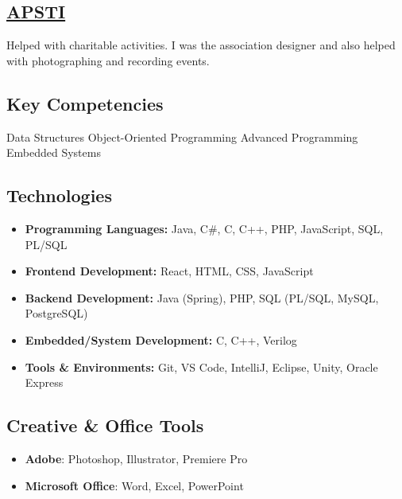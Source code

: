 \documentclass[a4paper]{MagicalCV}
\begin{document}
\begin{minipage}[t]{0.38\textwidth}
\subsection{\href{https://www.facebook.com/AsociatiaPSTI}{APSTI}}
Helped with charitable activities. I was the association designer and also helped with photographing and recording events.
\sectionsep

\end{minipage} 
\hfill
\begin{minipage}[t]{0.59\textwidth} 


\subsection{Key Competencies}
Data Structures \textbullet{} Object-Oriented Programming \textbullet{} Advanced Programming \textbullet{} Embedded Systems
\sectionsep

\subsection{Technologies}
\begin{itemize}
    \item \textbf{Programming Languages:} Java, C\#, C, C++, PHP, JavaScript, SQL, PL/SQL
    \item \textbf{Frontend Development:} React, HTML, CSS, JavaScript
    \item \textbf{Backend Development:} Java (Spring), PHP, SQL (PL/SQL, MySQL, PostgreSQL)
    \item \textbf{Embedded/System Development:} C, C++, Verilog
    \item \textbf{Tools \& Environments:} Git, VS Code, IntelliJ, Eclipse, Unity, Oracle Express
\end{itemize}
\sectionsep

\subsection{Creative \& Office Tools}
\begin{itemize}
    \item \textbf{Adobe}: Photoshop, Illustrator, Premiere Pro
    \item \textbf{Microsoft Office}: Word, Excel, PowerPoint
\end{itemize}
\sectionsep


\end{minipage}
\end{document}
